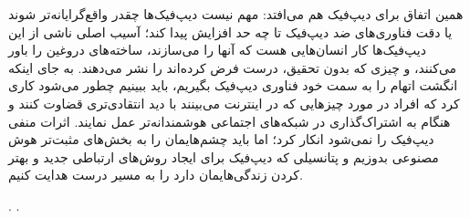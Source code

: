 \documentclass[12pt,a4paper]{report}
\begin{document}
	 	
	همین اتفاق برای دیپ‌فیک هم می‌افتد: مهم نیست دیپ‌فیک‌ها چقدر واقع‌گرایانه‌تر شوند یا دقت فناوری‌های ضد دیپ‌فیک تا چه حد افزایش پیدا کند؛ آسیب اصلی ناشی از این دیپ‌فیک‌ها کار انسان‌هایی هست که آنها را می‌سازند، ساخته‌های دروغین را باور می‌کنند، و چیزی که بدون تحقیق، درست فرض کرده‌اند را نشر می‌دهند. به جای اینکه انگشت اتهام را به سمت خود فناوری دیپ‌فیک بگیریم، باید ببینیم چطور می‌شود کاری کرد که افراد در مورد چیزهایی که در اینترنت می‌بینند با دید انتقادی‌تری قضاوت کنند و هنگام به اشتراک‌گذاری‌ در شبکه‌های اجتماعی هوشمندانه‌تر عمل نمایند. اثرات منفی دیپ‌فیک را نمی‌شود انکار کرد؛ اما باید چشم‌هایمان را به بخش‌های مثبت‌تر هوش مصنوعی بدوزیم و پتانسیلی که دیپ‌فیک برای ایجاد روش‌های ارتباطی جدید و بهتر کردن زندگی‌هایمان دارد را به مسیر درست هدایت کنیم.

\begin{thebibliography}{9}
	\latin
	.
	.
\end{thebibliography}
 	
\end{document}
